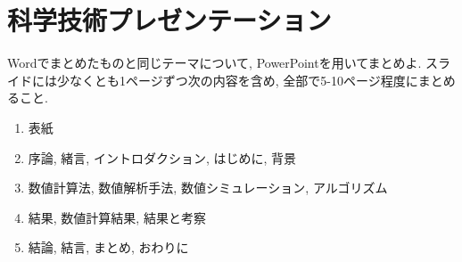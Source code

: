 \section{科学技術プレゼンテーション}
Wordでまとめたものと同じテーマについて, PowerPointを用いてまとめよ. 
スライドには少なくとも1ページずつ次の内容を含め, 全部で5-10ページ程度にまとめること. 

\begin{enumerate}
\item 表紙

\item 序論, 緒言, イントロダクション, はじめに, 背景

\item 数値計算法, 数値解析手法, 数値シミュレーション, アルゴリズム

\item 結果, 数値計算結果, 結果と考察

\item 結論, 結言, まとめ, おわりに


\end{enumerate}
